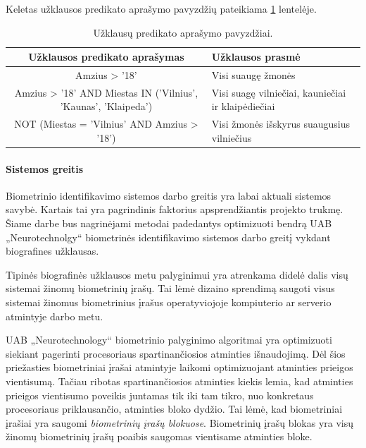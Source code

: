 Keletas užklausos predikato aprašymo pavyzdžių pateikiama \ref{tab:queryExamples} lentelėje.

\begin{table}[H]\footnotesize
	\centering
	\begin{tabular}{|c|l|}
		\hline
		{\bf Užklausos predikato aprašymas} & {\bf Užklausos prasmė} \\
		\hline
		Amzius > '18' & Visi suaugę žmonės\\
		\hline
		Amzius > '18' AND Miestas IN ('Vilnius', 'Kaunas', 'Klaipeda') & Visi suagę vilniečiai, kauniečiai ir klaipėdiečiai \\
		\hline
		NOT (Miestas = 'Vilnius' AND Amzius > '18') & Visi žmonės išskyrus suaugusius vilniečius \\
		\hline
	\end{tabular}
	\caption{Užklausų predikato aprašymo pavyzdžiai.}
	\label{tab:queryExamples}
\end{table}

\paragraph{Sistemos greitis}

Biometrinio identifikavimo sistemos darbo greitis yra labai aktuali sistemos savybė.
Kartais \cite{NeurotechnologyDRCDedublicationProject} \cite{NeurotechnologyVenezuelaDedublicationProject} tai yra pagrindinis faktorius apsprendžiantis projekto trukmę.
Šiame darbe bus nagrinėjami metodai padedantys optimizuoti bendrą UAB „Neurotechnolgy“ biometrinės identifikavimo sistemos \cite{NeurotechnologyMegamatcherAccelerator} darbo greitį vykdant biografines užklausas.

Tipinės biografinės užklausos metu palyginimui yra atrenkama didelė dalis visų sistemai žinomų biometrinių įrašų.
Tai lėmė dizaino sprendimą saugoti visus sistemai žinomus biometrinius įrašus operatyviojoje kompiuterio ar serverio atmintyje darbo metu.

UAB „Neurotechnology“ biometrinio palyginimo algoritmai yra optimizuoti siekiant pagerinti procesoriaus spartinančiosios atminties išnaudojimą.
Dėl šios priežasties biometriniai įrašai atmintyje laikomi optimizuojant atminties prieigos vientisumą.
Tačiau ribotas spartinančiosios atminties kiekis lemia, kad atminties prieigos vientisumo poveikis juntamas tik iki tam tikro, nuo konkretaus procesoriaus priklausančio, atminties bloko dydžio.
Tai lėmė, kad biometriniai įrašiai yra saugomi {\it biometrinių įrašų blokuose}.
Biometrinių įrašų blokas yra visų žinomų biometrinių įrašų poaibis saugomas vientisame atminties bloke.

